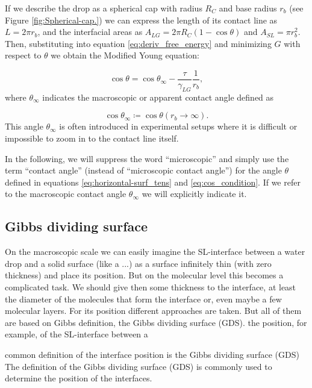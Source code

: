 If we describe the drop as a spherical cap with radius $R_{C}$ and
base radius $r_{b}$ (see Figure \ref{fig:Spherical-cap.}) we can
express the length of its contact line as $L=2\pi r_{b}$, and the
interfacial areas as $A_{LG}=2\pi R_{C}(1-\cos\theta)$ and $A_{SL}=\pi r_{b}^{2}$.
Then, substituting into equation \ref{eq:deriv_free_energy} and minimizing
$G$ with respect to $\theta$ we obtain the Modified Young equation:

\begin{equation}
\cos\theta=\cos\theta_{\infty}-\frac{\tau}{\gamma_{LG}}\frac{1}{r_{b}},\label{eq: young-eq-mod}
\end{equation}
where $\theta_{\infty}$ indicates the macroscopic or apparent contact
angle defined as

\begin{equation}
\cos\theta_{\infty}\coloneqq\cos\theta(r_{b}\rightarrow\infty).\label{eq:def_apparent_c_angle}
\end{equation}
This angle $\theta_{\infty}$ is often introduced in experimental
setups where it is difficult or impossible to zoom in to the contact
line itself.

In the following, we will suppress the word ``microscopic'' and
simply use the term ``contact angle'' (instead of ``microscopic
contact angle'') for the angle $\theta$ defined in equations \ref{eq:horizontal-surf_tens}
and \ref{eq:cos_condition}. If we refer to the macroscopic contact
angle $\theta_{\infty}$ we will explicitly indicate it.

\subsection{Gibbs dividing surface}

On the macroscopic scale we can easily imagine the SL-interface between
a water drop and a solid surface (like a ...) as a surface infinitely
thin (with zero thickness) and place its position. But on the molecular
level this becomes a complicated task. We should give then some thickness
to the interface, at least the diameter of the molecules that form
the interface or, even maybe a few molecular layers. For its position
different approaches are taken. But all of them are based on Gibbs
definition, the Gibbs dividing surface (GDS). the position, for example,
of the SL-interface between a

common definition of the interface position is the Gibbs dividing
surface (GDS) The definition of the Gibbs dividing surface (GDS) is
commonly used to determine the position of the interfaces.


